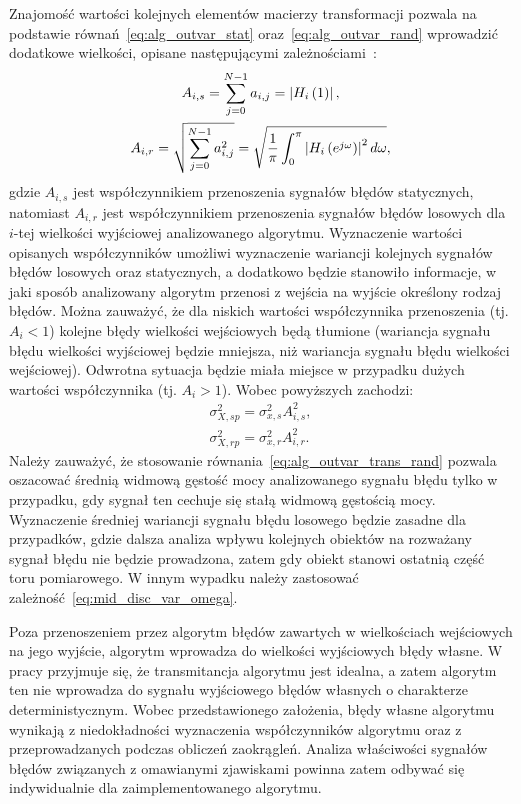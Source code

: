 Znajomość wartości kolejnych elementów macierzy transformacji pozwala na podstawie równań~\eqref{eq:alg_outvar_stat} oraz~\eqref{eq:alg_outvar_rand} wprowadzić dodatkowe wielkości, opisane następującymi zależnościami~\cite{jakubiec_algorithms, oppenheim_dsp, proakis_dsp}:
\begin{gather}
A_{i,s} = \sum _{j = 0} ^{N-1} a_{i, j} = \left| H_{i} \left(1\right) \right| \label{eq:alg_trans_stat}, \\
A_{i,r} = \sqrt{\sum _{j = 0} ^{N-1} a_{i, j}^{2}} = \sqrt{\frac{1}{\pi} \int _{0} ^{\pi} \left| H_{i} \left(e^{j \omega}\right) \right|^{2} d\omega} \label{eq:alg_trans_rand},
\end{gather}
gdzie $A_{i,s}$ jest współczynnikiem przenoszenia sygnałów błędów statycznych, natomiast $A_{i,r}$ jest współczynnikiem przenoszenia sygnałów błędów losowych dla $i$-tej wielkości wyjściowej analizowanego algorytmu. Wyznaczenie wartości opisanych współczynników umożliwi wyznaczenie wariancji kolejnych sygnałów błędów losowych oraz statycznych, a dodatkowo będzie stanowiło informacje, w jaki sposób analizowany algorytm przenosi z wejścia na wyjście określony rodzaj błędów. Można zauważyć, że dla niskich wartości współczynnika przenoszenia (tj. $A_{i} < 1$) kolejne błędy wielkości wejściowych będą tłumione (wariancja sygnału błędu wielkości wyjściowej będzie mniejsza, niż wariancja sygnału błędu wielkości wejściowej). Odwrotna sytuacja będzie miała miejsce w przypadku dużych wartości współczynnika (tj. $A_{i} > 1$). Wobec powyższych zachodzi:
\begin{gather}
\sigma_{X,sp}^{2} = \sigma_{x,s}^{2} A_{i,s}^{2} \label{eq:alg_outvar_trans_stat}, \\
\sigma_{X,rp}^{2} = \sigma_{x,r}^{2} A_{i,r}^{2} \label{eq:alg_outvar_trans_rand}.
\end{gather}
Należy zauważyć, że stosowanie równania~\eqref{eq:alg_outvar_trans_rand} pozwala oszacować średnią widmową gęstość mocy analizowanego sygnału błędu tylko w przypadku, gdy sygnał ten cechuje się stałą widmową gęstością mocy. Wyznaczenie średniej wariancji sygnału błędu losowego będzie zasadne dla przypadków, gdzie dalsza analiza wpływu kolejnych obiektów na rozważany sygnał błędu nie będzie prowadzona, zatem gdy obiekt stanowi ostatnią część toru pomiarowego. W innym wypadku należy zastosować zależność~\eqref{eq:mid_disc_var_omega}.

Poza przenoszeniem przez algorytm błędów zawartych w wielkościach wejściowych na jego wyjście, algorytm wprowadza do wielkości wyjściowych błędy własne. W pracy przyjmuje się, że transmitancja algorytmu jest idealna, a zatem algorytm ten nie wprowadza do sygnału wyjściowego błędów własnych o charakterze deterministycznym. Wobec przedstawionego założenia, błędy własne algorytmu wynikają z niedokładności wyznaczenia współczynników algorytmu oraz z przeprowadzanych podczas obliczeń zaokrągleń. Analiza właściwości sygnałów błędów związanych z omawianymi zjawiskami powinna zatem odbywać się indywidualnie dla zaimplementowanego algorytmu.

